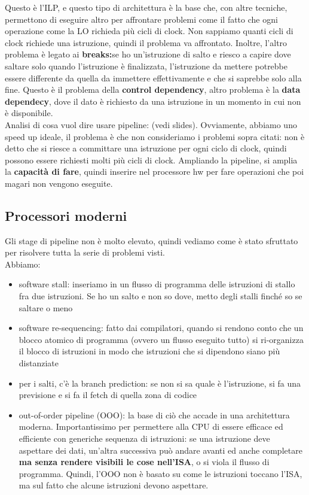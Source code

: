 \documentclass[14pt]{article}
\begin{document}
Questo è l'ILP, e questo tipo di architettura è la base che, con altre tecniche, permettono di eseguire altro per affrontare problemi come il fatto che ogni operazione come la LO richieda più cicli di clock. Non sappiamo quanti cicli di clock richiede una istruzione, quindi il problema va affrontato. Inoltre, l'altro problema è legato ai \textbf{breaks:}se ho un'istruzione di salto e riesco a capire dove saltare solo quando l'istruzione è finalizzata, l'istruzione da mettere potrebbe essere differente da quella da immettere effettivamente e che si saprebbe solo alla fine. Questo è il problema della \textbf{control dependency}, altro problema è la \textbf{data dependecy}, dove il dato è richiesto da una istruzione in un momento in cui non è disponibile.\\ Analisi di cosa vuol dire usare pipeline: (vedi slides). Ovviamente, abbiamo uno speed up ideale, il problema è che non consideriamo i problemi sopra citati: non è detto che si riesce a committare una istruzione per ogni ciclo di clock, quindi possono essere richiesti molti più cicli di clock. Ampliando la pipeline, si amplia la \textbf{capacità di fare}, quindi inserire nel processore hw per fare operazioni che poi magari non vengono eseguite.
\subsection{Processori moderni}
Gli stage di pipeline non è molto elevato, quindi vediamo come è stato sfruttato per risolvere tutta la serie di problemi visti.\\ Abbiamo:
\begin{itemize}
\item software stall: inseriamo in un flusso di programma delle istruzioni di stallo fra due istruzioni. Se ho un salto e non so dove, metto degli stalli finché so se saltare o meno
\item software re-sequencing: fatto dai compilatori, quando si rendono conto che un blocco atomico di programma (ovvero un flusso eseguito tutto) si ri-organizza il blocco di istruzioni in modo che istruzioni che si dipendono siano più distanziate
\item per i salti, c'è la branch prediction: se non si sa quale è l'istruzione, si fa una previsione e si fa il fetch di quella zona di codice
\item out-of-order pipeline (OOO): la base di ciò che accade in una architettura moderna. Importantissimo per permettere alla CPU di essere efficace ed efficiente con generiche sequenza di istruzioni: se una istruzione deve aspettare dei dati, un'altra successiva può andare avanti ed anche completare \textbf{ma senza rendere visibili le cose nell'ISA}, o si viola il flusso di programma. Quindi, l'OOO non è basato su come le istruzioni toccano l'ISA, ma sul fatto che alcune istruzioni devono aspettare.
\end{itemize}
\end{document}

